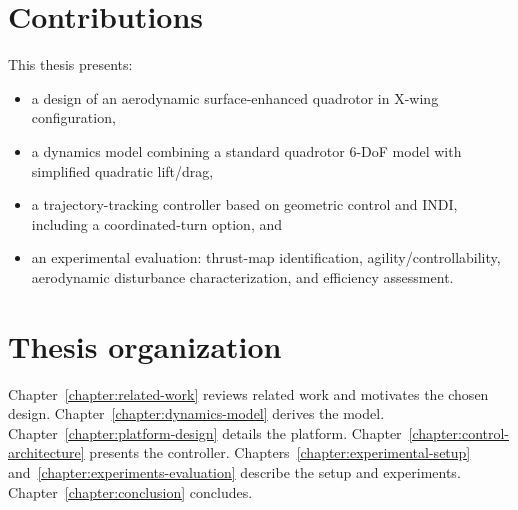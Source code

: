 \section{Contributions}
This thesis presents:
\begin{itemize}
  \item a design of an aerodynamic surface-enhanced quadrotor in X-wing configuration,
  \item a dynamics model combining a standard quadrotor 6-DoF model with simplified quadratic lift/drag,
  \item a trajectory-tracking controller based on geometric control and INDI, including a coordinated-turn option, and
  \item an experimental evaluation: thrust-map identification, agility/controllability, aerodynamic disturbance characterization, and efficiency assessment.
\end{itemize}

\section{Thesis organization}
Chapter~\ref{chapter:related-work} reviews related work and motivates the chosen design. Chapter~\ref{chapter:dynamics-model} derives the model. Chapter~\ref{chapter:platform-design} details the platform. Chapter~\ref{chapter:control-architecture} presents the controller. Chapters~\ref{chapter:experimental-setup} and~\ref{chapter:experiments-evaluation} describe the setup and experiments. Chapter~\ref{chapter:conclusion} concludes.
